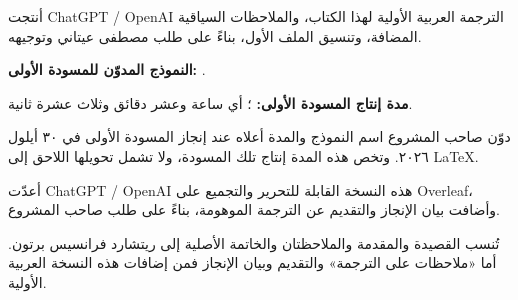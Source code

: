 
أنتجت \textenglish{ChatGPT / OpenAI} الترجمة العربية الأولية لهذا الكتاب، والملاحظات السياقية المضافة، وتنسيق الملف الأول، بناءً على طلب مصطفى عيتاني وتوجيهه.

\textbf{النموذج المدوّن للمسودة الأولى:} \RecordedModel.

\textbf{مدة إنتاج المسودة الأولى:} \RecordedDraftTime؛ أي ساعة وعشر دقائق وثلاث عشرة ثانية.

دوّن صاحب المشروع اسم النموذج والمدة أعلاه عند إنجاز المسودة الأولى في ٣٠ أيلول ٢٠٢٦. وتخص هذه المدة إنتاج تلك المسودة، ولا تشمل تحويلها اللاحق إلى \textenglish{\LaTeX}.

أعدّت \textenglish{ChatGPT / OpenAI} هذه النسخة القابلة للتحرير والتجميع على \textenglish{Overleaf}، وأضافت بيان الإنجاز والتقديم عن الترجمة الموهومة، بناءً على طلب صاحب المشروع.

تُنسب القصيدة والمقدمة والملاحظتان والخاتمة الأصلية إلى ريتشارد فرانسيس برتون. أما «ملاحظات على الترجمة» والتقديم وبيان الإنجاز فمن إضافات هذه النسخة العربية الأولية.

